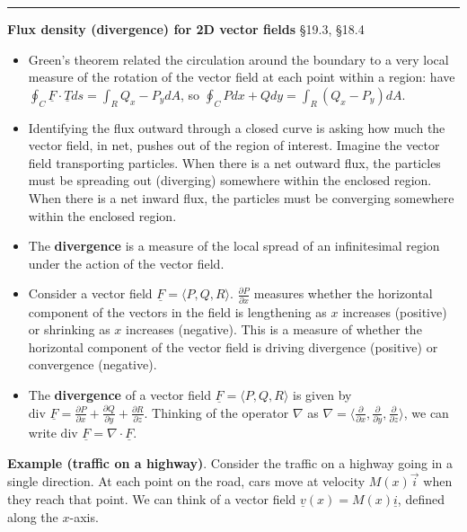 \documentclass[12pt,letterpaper,noanswers]{exam}
\newcommand{\mb}[1]{\underline{#1}}
\begin{document}
\vspace{0.2cm}
\hrule
\vspace{0.2cm}
\noindent\textbf{Flux density (divergence) for 2D vector fields} \S 19.3, \S 18.4
\begin{tcolorbox}
\begin{itemize}
\itemsep0em
    \item Green's theorem related the circulation around the boundary to a very local measure of the rotation of the vector field at each point within a region: have $\oint_C \mb F\cdot \mb T ds = \int_R Q_x - P_y dA$, so $\oint_C Pdx + Qdy = \int_R (Q_x - P_y) dA$.
    \item Identifying the flux outward through a closed curve is asking how much the vector field, in net, pushes out of the region of interest.  Imagine the vector field transporting particles.  When there is a net outward flux, the particles must be spreading out (diverging) somewhere within the enclosed region.  When there is a net inward flux, the particles must be converging somewhere within the enclosed region.
    \item The \textbf{divergence} is a measure of the local spread of an infinitesimal region under the action of the vector field.
    \item Consider a vector field $\mb F = \langle P,Q,R\rangle$.  $\frac{\partial P}{\partial x}$ measures whether the horizontal component of the vectors in the field is lengthening as $x$ increases (positive) or shrinking as $x$ increases (negative).  This is a measure of whether the horizontal component of the vector field is driving divergence (positive) or convergence (negative).
    \item The \textbf{divergence} of a vector field $\mb F = \langle P,Q,R\rangle$ is given by $\text{div }\mb F = \frac{\partial P}{\partial x}+\frac{\partial Q}{\partial y}+\frac{\partial R}{\partial z}$.  Thinking of the operator $\nabla$ as $\nabla = \langle \frac{\partial }{\partial x},\frac{\partial}{\partial y},\frac{\partial}{\partial z}\rangle$, we can write $\text{div }\mb F = \nabla \cdot \mb F$.
\end{itemize}
\end{tcolorbox}
\noindent\textbf{Example (traffic on a highway)}.  Consider the traffic on a highway going in a single direction.  At each point on the road, cars move at velocity $M(x)\vec i$ when they reach that point.  We can think of a vector field $\mb v(x) = M(x)\mb i$, defined along the $x$-axis.  
\end{document}
